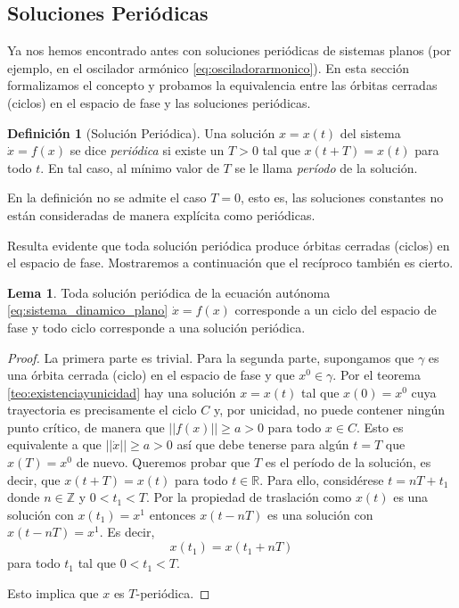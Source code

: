 \documentclass[11pt]{book}
\theoremstyle{definition}
\newtheorem{definition}{Definición}
\numberwithin{definition}{section}
\theoremstyle{theorem}
\newtheorem{lemma}{Lema}
\numberwithin{theorem}{section}
\numberwithin{lemma}{section}
\numberwithin{corollary}{section}
\theoremstyle{plain}
\numberwithin{example}{section}
\newcommand{\Z}{{\ensuremath{\mathbb{Z}}}}
\newcommand{\R}{{\ensuremath{\mathbb{R}}}}
\begin{document}
\subsection{Soluciones Periódicas}

Ya nos hemos encontrado antes con soluciones periódicas de sistemas planos (por ejemplo, en el oscilador armónico \ref{eq:osciladorarmonico}). En esta sección formalizamos el concepto y probamos la equivalencia entre las órbitas cerradas (ciclos) en el espacio de fase y las soluciones periódicas.

\begin{definition}[Solución Periódica] Una solución $x = x(t)$ del sistema $\dot{x} = f(x)$ se dice \emph{periódica} si existe un $T > 0$ tal que $x(t+T) = x(t)$ para todo $t$. En tal caso, al mínimo valor de $T$ se le llama \textit{período} de la solución.
\end{definition}

En la definición no se admite el caso $T=0$, esto es, las soluciones constantes no están consideradas de manera explícita como periódicas.

Resulta evidente que toda solución periódica produce órbitas cerradas (ciclos) en el espacio de fase. Mostraremos a continuación que el recíproco también es cierto.

\begin{lemma}
Toda solución periódica de la ecuación autónoma \ref{eq:sistema_dinamico_plano} $\dot{x} = f(x)$ corresponde a un ciclo del espacio de fase y todo ciclo corresponde a una solución periódica.
\end{lemma}
\begin{proof}
La primera parte es trivial. Para la segunda parte, supongamos que $\gamma$ es una órbita cerrada (ciclo) en el espacio de fase y que $x^0 \in \gamma$.
Por el teorema \ref{teo:existenciayunicidad} hay una solución $x = x(t)$ tal que $x(0) = x^0$ cuya trayectoria es precisamente el ciclo $C$ y, por unicidad, no puede contener ningún punto crítico, de manera que $|| f(x) || \geq a > 0$ para todo $x \in C$.
Esto es equivalente a que $|| \dot{x} || \geq a > 0$ así que debe tenerse para algún $t = T$ que $x(T) = x^0$ de nuevo. Queremos probar que $T$ es el período de la solución, es decir, que $x(t+T) = x(t)$ para todo $t \in \R$. Para ello, considérese $t = nT + t_1$ donde $n \in \Z$ y $0 < t_1 < T$. Por la propiedad de traslación como $x(t)$ es una solución con $x(t_1) = x^1$ entonces $x(t - nT)$ es una solución con $x(t - nT) = x^1$. Es decir, $$ x(t_1) = x(t_1 + nT)$$ para todo $t_1$ tal que $0 < t_1 < T$.

Esto implica que $x$ es $T$-periódica.
\end{proof}
\end{document}
